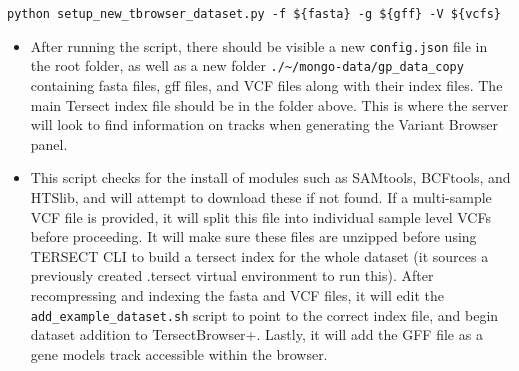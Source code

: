 \documentclass[12pt]{article}
\begin{document}
\begin{enumerate}
        \verb+python setup_new_tbrowser_dataset.py -f ${fasta} -g ${gff} -V ${vcfs}+
        \begin{itemize}
            \item After running the script, there should be visible a new \verb+config.json+ file in the root folder, as well as a new folder \verb+./~/mongo-data/gp_data_copy+ containing fasta files, gff files, and VCF files along with their index files. The main Tersect index file should be in the folder above. This is where the server will look to find information on tracks when generating the Variant Browser panel.
            \item This script checks for the install of modules such as SAMtools, BCFtools, and HTSlib, and will attempt to download these if not found. If a multi-sample VCF file is provided, it will split this file into individual sample level VCFs before proceeding. It will make sure these files are unzipped before using TERSECT CLI to build a tersect index for the whole dataset (it sources a previously created .tersect virtual environment to run this). After recompressing and indexing the fasta and VCF files, it will edit the \verb+add_example_dataset.sh+ script to point to the correct index file, and begin dataset addition to TersectBrowser+. Lastly, it will add the GFF file as a gene models track accessible within the browser.
        \end{itemize}
\end{enumerate}
\end{document}
